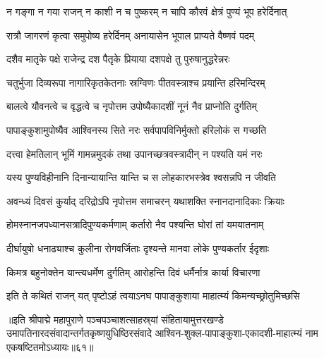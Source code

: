 \twolineshloka
{न गङ्गा न गया राजन् न काशी न च पुष्करम्}
{न चापि कौरवं क्षेत्रं पुण्यं भूप हरेर्दिनात्}%

\twolineshloka
{रात्रौ जागरणं कृत्वा समुपोष्य हरेर्दिनम्}
{अनायासेन भूपाल प्राप्यते वैष्णवं पदम्}%

\twolineshloka
{दशैव मातृके पक्षे राजेन्द्र दश पैतृके}
{प्रियाया दशपक्षे तु पुरुषानुद्धरेन्नरः}%

\twolineshloka
{चतुर्भुजा दिव्यरूपा नागारिकृतकेतनाः}
{स्रग्विणः पीतवस्त्राश्च प्रयान्ति हरिमन्दिरम्}%

\twolineshloka
{बालत्वे यौवनत्वे च वृद्धत्वे च नृपोत्तम}
{उपोष्यैकादशीं नूनं नैव प्राप्नोति दुर्गतिम्}%

\twolineshloka
{पापाङ्कुशामुपोष्यैव आश्विनस्य सिते नरः}
{सर्वपापविनिर्मुक्तो हरिलोकं स गच्छति}%

\twolineshloka
{दत्त्वा हेमतिलान् भूमिं गामन्नमुदकं तथा}
{उपानच्छत्रवस्त्रादीन् न पश्यति यमं नरः}%

\twolineshloka
{यस्य पुण्यविहीनानि दिनान्यायान्ति यान्ति च}
{स लोहकारभस्त्रेव श्वसन्नपि न जीवति}%

\twolineshloka
{अवन्ध्यं दिवसं कुर्याद् दरिद्रोऽपि नृपोत्तम}
{समाचरन् यथाशक्ति स्नानदानादिकाः क्रियाः}%

\twolineshloka
{होमस्नानजपध्यानसत्रादिपुण्यकर्मणाम्}
{कर्तारो नैव पश्यन्ति घोरां तां यमयातनाम्}%

\twolineshloka
{दीर्घायुषो धनाढ्याश्च कुलीना रोगवर्जिताः}
{दृश्यन्ते मानवा लोके पुण्यकर्तार ईदृशाः}%

\twolineshloka
{किमत्र बहुनोक्तेन यान्त्यधर्मेण दुर्गतिम्}
{आरोहन्ति दिवं धर्मैर्नात्र कार्या विचारणा}%

\twolineshloka
{इति ते कथितं राजन् यत् पृष्टोऽहं त्वयाऽनघ}
{पापाङ्कुशाया माहात्म्यं किमन्यच्छ्रोतुमिच्छसि}%

॥इति श्रीपाद्मे महापुराणे पञ्चपञ्चाशत्साहस्र्यां संहितायामुत्तरखण्डे उमापतिनारदसंवादान्तर्गतकृष्णयुधिष्ठिरसंवादे आश्विन-शुक्ल-पापाङ्कुशा-एकादशी-माहात्म्यं नाम एकषष्टितमोऽध्यायः॥६१॥

\genMangalaShloka

\hyperref[sec:ekadashi_mahatmyam_padma_puranam]{\closesub}
\clearpage

